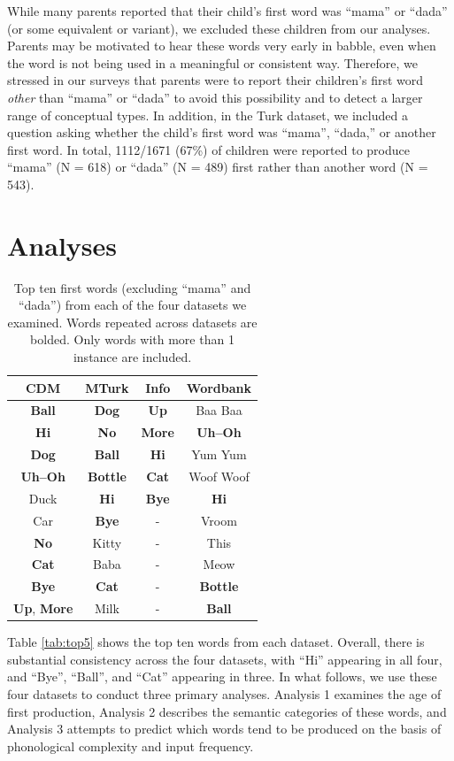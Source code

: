 \documentclass[10pt,letterpaper]{article}
\begin{document}
While many parents reported that their child's first word was ``mama'' or ``dada'' (or some equivalent or variant), we excluded these children from our analyses. Parents may be motivated to hear these words very early in babble, even when the word is not being used in a meaningful or consistent way. Therefore, we stressed in our surveys that parents were to report their children's first word \emph{other} than ``mama'' or ``dada'' to avoid this possibility and to detect a larger range of conceptual types. In addition, in the Turk dataset, we included a question asking whether the child's first word was ``mama'', ``dada,'' or another first word. In total, 1112/1671 (67\%) of children were reported to produce ``mama'' (N = 618) or ``dada'' (N = 489) first rather than another word (N = 543).
\section{Analyses}


\begin{table}[t!]
\centering
\begin{tabular}{cccc}
\hline
{\bf CDM} & {\bf MTurk} & {\bf Info} & {\bf Wordbank} \\ 
\hline
\textbf{Ball} & \textbf{Dog} & \textbf{Up} & Baa Baa \\ 
\textbf{Hi} & \textbf{No} & \textbf{More} & \textbf{Uh--Oh} \\
\textbf{Dog} & \textbf{Ball} & \textbf{Hi} & Yum Yum \\ 
\textbf{Uh--Oh} & \textbf{Bottle} & \textbf{Cat} & Woof Woof \\ 
Duck & \textbf{Hi} & \textbf{Bye} & \textbf{Hi} \\
Car & \textbf{Bye}  & - & Vroom \\
\textbf{No} & Kitty & - & This \\
\textbf{Cat}  & Baba & - &  Meow \\
\textbf{Bye}  & \textbf{Cat}  & - & \textbf{Bottle} \\
\textbf{Up}, \textbf{More} & Milk & - & \textbf{Ball} \\
\hline 
\end{tabular}
\caption{\label{tab:top10} Top ten first words (excluding ``mama'' and ``dada'') from each of the four datasets we examined. Words repeated across datasets are bolded. Only words with more than 1 instance are included.}
\end{table}

Table \ref{tab:top5} shows the top ten words from each dataset. Overall, there is substantial consistency across the four datasets, with ``Hi'' appearing in all four, and ``Bye'', ``Ball'', and ``Cat'' appearing in three. In what follows, we use these four datasets to conduct three primary analyses. Analysis 1 examines the age of first production, Analysis 2 describes the semantic categories of these words, and Analysis 3 attempts to predict which words tend to be produced on the basis of phonological complexity and input frequency.
\end{document}
